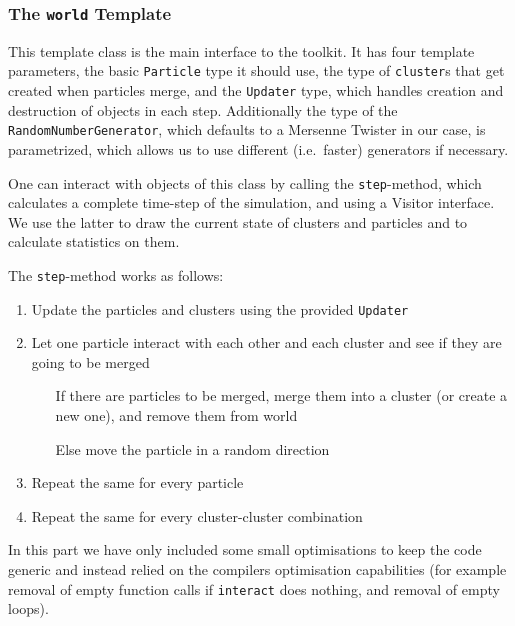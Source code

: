 \documentclass[twocolumn, 10pt]{scrartcl}
\begin{document}
            \subsubsection{The \lstinline!world! Template}
                This template class is the main interface to the toolkit. It has four template parameters, the basic
                \lstinline!Particle! type it should use, the type of \lstinline!cluster!s that get created when
                particles merge, and the \lstinline!Updater! type, which handles creation and destruction of objects in
                each step.  Additionally the type of the \lstinline!RandomNumberGenerator!, which defaults to a Mersenne
                Twister in our case, is parametrized, which allows us to use different (i.e.\ faster) generators if
                necessary.

                One can interact with objects of this class by calling the \lstinline!step!-method, which calculates a
                complete time-step of the simulation, and using a Visitor interface. We use the latter to draw the
                current state of clusters and particles and to calculate statistics on them.

                The \lstinline!step!-method works as follows:
                \begin{enumerate}
                    \item Update the particles and clusters using the provided \lstinline!Updater!
                    \item Let one particle interact with each other and each cluster and see if they are going to be
                        merged
                        \begin{itemize}
                            \item[If] there are particles to be merged, merge them into a cluster (or create a new one),
                                and remove them from world
                            \item[Else] move the particle in a random direction
                        \end{itemize}
                    \item Repeat the same for every particle
                    \item Repeat the same for every cluster-cluster combination
                \end{enumerate}
                In this part we have only included some small optimisations to keep the code generic and instead relied
                on the compilers optimisation capabilities (for example removal of empty function calls if
                \lstinline'interact' does nothing, and removal of empty loops).
\end{document}
